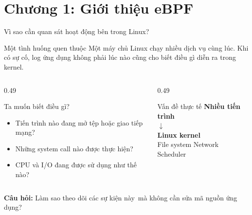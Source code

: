\section{Chương 1: Giới thiệu eBPF}

\begin{frame}{Vì sao cần quan sát hoạt động bên trong Linux?}
  \begin{block}{Một tình huống quen thuộc}
    Một máy chủ Linux chạy nhiều dịch vụ cùng lúc. Khi có sự cố, log ứng dụng
    không phải lúc nào cũng cho biết điều gì diễn ra trong kernel.
  \end{block}
  \vspace{0.13cm}
  \begin{columns}[T,onlytextwidth]
    \begin{column}{0.49\textwidth}
      \begin{block}{Ta muốn biết điều gì?}
        \begin{itemize}
          \item Tiến trình nào đang mở tệp hoặc giao tiếp mạng?
          \item Những system call nào được thực hiện?
          \item CPU và I/O đang được sử dụng như thế nào?
        \end{itemize}
      \end{block}
    \end{column}
    \begin{column}{0.49\textwidth}
      \begin{block}{Vấn đề thực tế}
        \centering
        \textbf{Nhiều tiến trình}\\[0.14cm]
        $\downarrow$\\[0.14cm]
        \textbf{Linux kernel}\\[0.14cm]
        \footnotesize{File system \quad Network \quad Scheduler}
      \end{block}
    \end{column}
  \end{columns}
  \vspace{0.10cm}
  \centering\textbf{Câu hỏi:} Làm sao theo dõi các sự kiện này\ mà không cần sửa mã nguồn ứng dụng?
\end{frame}

